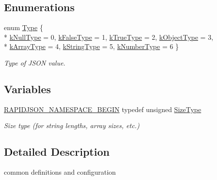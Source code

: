 \subsection*{Enumerations}
\begin{DoxyCompactItemize}
\item 
enum \hyperlink{a00677_a1d1cfd8ffb84e947f82999c682b666a7}{Type} \{ \\*
\hyperlink{a00677_a1d1cfd8ffb84e947f82999c682b666a7aa09befbfb4f2e1409f237817979d8087}{k\+Null\+Type} = 0, 
\hyperlink{a00677_a1d1cfd8ffb84e947f82999c682b666a7a062b8296274a258acf0e142868684c54}{k\+False\+Type} = 1, 
\hyperlink{a00677_a1d1cfd8ffb84e947f82999c682b666a7a209434e5edd66630011ca19d710d7cd6}{k\+True\+Type} = 2, 
\hyperlink{a00677_a1d1cfd8ffb84e947f82999c682b666a7a146f46700e905e8df96a6a90b5c7640f}{k\+Object\+Type} = 3, 
\\*
\hyperlink{a00677_a1d1cfd8ffb84e947f82999c682b666a7af41527d6925efa3c5c3dadb23dfef7c8}{k\+Array\+Type} = 4, 
\hyperlink{a00677_a1d1cfd8ffb84e947f82999c682b666a7a2d823b89b055bc743d05c03183d3f338}{k\+String\+Type} = 5, 
\hyperlink{a00677_a1d1cfd8ffb84e947f82999c682b666a7afc9f813b7aaf71911bdae20a86b2702d}{k\+Number\+Type} = 6
 \}\begin{DoxyCompactList}\small\item\em Type of J\+S\+ON value. \end{DoxyCompactList}
\end{DoxyCompactItemize}
\subsection*{Variables}
\begin{DoxyCompactItemize}
\item 
\hyperlink{a00833_gad3806c8251fdc7da9618b7e922674ffc}{R\+A\+P\+I\+D\+J\+S\+O\+N\+\_\+\+N\+A\+M\+E\+S\+P\+A\+C\+E\+\_\+\+B\+E\+G\+IN} typedef unsigned \hyperlink{a00677_a5ed6e6e67250fadbd041127e6386dcb5}{Size\+Type}
\begin{DoxyCompactList}\small\item\em Size type (for string lengths, array sizes, etc.) \end{DoxyCompactList}\end{DoxyCompactItemize}


\subsection{Detailed Description}
common definitions and configuration 

